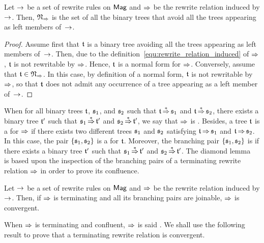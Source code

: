 \begin{Lemma} \label{lem:normal_forms_avoiding}
    Let $\operatorname{\to}$ be a set of rewrite rules on $\mathsf{Mag}$ and $\operatorname{\Rightarrow}$ be
    the rewrite relation induced by $\operatorname{\to}$. Then,
    $\mathfrak{N}_{\operatorname{\Rightarrow}}$ is the set of all the binary trees that
    avoid all the trees appearing as left members of~$\operatorname{\to}$.
\end{Lemma}
\begin{proof}
    Assume first that $\mathfrak{t}$ is a binary tree avoiding all the trees
    appearing as left members of~$\operatorname{\to}$. Then, due to the
    definition~\eqref{equ:rewrite_relation_induced} of $\operatorname{\Rightarrow}$,
    $\mathfrak{t}$ is not rewritable by $\operatorname{\Rightarrow}$. Hence, $\mathfrak{t}$ is a normal
    form for $\operatorname{\Rightarrow}$. Conversely, assume that
    $\mathfrak{t} \in \mathfrak{N}_{\operatorname{\Rightarrow}}$. In this case, by definition
    of a normal form, $\mathfrak{t}$ is not rewritable by $\operatorname{\Rightarrow}$, so that
    $\mathfrak{t}$ does not admit any occurrence of a tree appearing as a left
    member of~$\operatorname{\to}$.
\end{proof}
\medbreak

When for all binary trees $\mathfrak{t}$, $\mathfrak{s}_1$, and $\mathfrak{s}_2$ such that
$\mathfrak{t} \operatorname{\overset{\ast}{\operatorname{\Rightarrow}}} \mathfrak{s}_1$ and $\mathfrak{t} \operatorname{\overset{\ast}{\operatorname{\Rightarrow}}} \mathfrak{s}_2$, there
exists a binary tree $\mathfrak{t}'$ such that $\mathfrak{s}_1 \operatorname{\overset{\ast}{\operatorname{\Rightarrow}}} \mathfrak{t}'$ and
$\mathfrak{s}_2 \operatorname{\overset{\ast}{\operatorname{\Rightarrow}}} \mathfrak{t}'$, we say that $\operatorname{\Rightarrow}$ is
. Besides, a tree $\mathfrak{t}$ is a  for
$\operatorname{\Rightarrow}$ if there exists two different trees $\mathfrak{s}_1$ and $\mathfrak{s}_2$
satisfying $\mathfrak{t} \operatorname{\Rightarrow} \mathfrak{s}_1$ and $\mathfrak{t} \operatorname{\Rightarrow} \mathfrak{s}_2$. In
this case, the pair $\{\mathfrak{s}_1, \mathfrak{s}_2\}$ is a  for
$\mathfrak{t}$. Moreover, the branching pair $\{\mathfrak{s}_1, \mathfrak{s}_2\}$ is
 if there exists a binary tree $\mathfrak{t}'$ such that
$\mathfrak{s}_1 \operatorname{\overset{\ast}{\operatorname{\Rightarrow}}} \mathfrak{t}'$ and $\mathfrak{s}_2 \operatorname{\overset{\ast}{\operatorname{\Rightarrow}}} \mathfrak{t}'$. The
diamond lemma~\cite{New42} is based upon the inspection of the branching
pairs of a terminating rewrite relation $\operatorname{\Rightarrow}$ in order to prove
its confluence.
\medbreak

\begin{Lemma} \label{lem:diamond_lemma}
    Let $\operatorname{\to}$ be a set of rewrite rules on $\mathsf{Mag}$ and $\operatorname{\Rightarrow}$ be
    the rewrite relation induced by $\operatorname{\to}$. Then, if $\operatorname{\Rightarrow}$ is
    terminating and all its branching pairs are joinable, $\operatorname{\Rightarrow}$
    is convergent.
\end{Lemma}
\medbreak

When $\operatorname{\Rightarrow}$ is terminating and confluent, $\operatorname{\Rightarrow}$ is said
. We shall use the following result to prove that
a terminating rewrite relation is convergent. 
\medbreak

